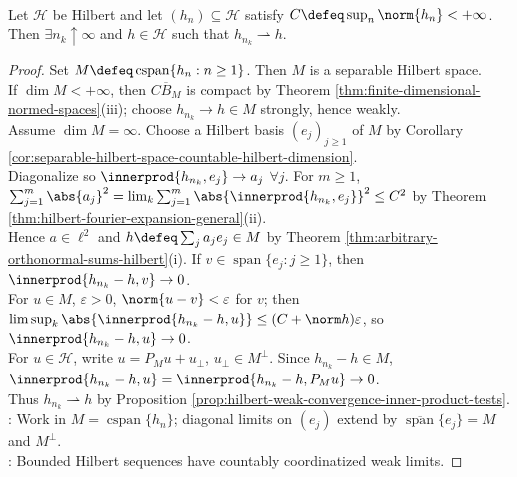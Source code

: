 \begin{theorem} \label{thm:hilbert-weak-subsequential-compactness} \\
Let $\mathcal{H}$ be Hilbert and let $(h_n)\subseteq\mathcal{H}$ satisfy $C\defeq\sup_n\norm{h_n}<+\infty$. Then $\exists n_k\uparrow\infty$ and $h\in\mathcal{H}$ such that $h_{n_k}\rightharpoonup h$.
\begin{proof} Set $M\defeq\operatorname{cspan}\{h_n:n\geq1\}$. Then $M$ is a separable Hilbert space.\\
If $\dim M<+\infty$, then $C\overline{B}_M$ is compact by Theorem \ref{thm:finite-dimensional-normed-spaces}(iii); choose $h_{n_k}\to h\in M$ strongly, hence weakly.\\
Assume $\dim M=\infty$. Choose a Hilbert basis $(e_j)_{j\geq1}$ of $M$ by Corollary \ref{cor:separable-hilbert-space-countable-hilbert-dimension}.\\
Diagonalize so $\innerprod{h_{n_k},e_j}\to a_j$ $\forall j$. For $m\geq1$, $\sum_{j=1}^m\abs{a_j}^2=\lim_k\sum_{j=1}^m\abs{\innerprod{h_{n_k},e_j}}^2\leq C^2$ by Theorem \ref{thm:hilbert-fourier-expansion-general}(ii).\\
Hence $a\in\ell^2$ and $h\defeq\sum_j a_je_j\in M$ by Theorem \ref{thm:arbitrary-orthonormal-sums-hilbert}(i). If $v\in\operatorname{span}\{e_j:j\geq1\}$, then $\innerprod{h_{n_k}-h,v}\to0$.\\
For $u\in M$, $\varepsilon>0$, $\norm{u-v}<\varepsilon$ for $v$; then $\limsup_k\abs{\innerprod{h_{n_k}-h,u}}\leq(C+\norm h)\varepsilon$, so $\innerprod{h_{n_k}-h,u}\to0$.\\
For $u\in\mathcal H$, write $u=P_Mu+u_\perp$, $u_\perp\in M^\perp$. Since $h_{n_k}-h\in M$, $\innerprod{h_{n_k}-h,u}=\innerprod{h_{n_k}-h,P_Mu}\to0$.\\
Thus $h_{n_k}\rightharpoonup h$ by Proposition \ref{prop:hilbert-weak-convergence-inner-product-tests}.\\
: Work in $M=\operatorname{cspan}\{h_n\}$; diagonal limits on $(e_j)$ extend by $\overline{\operatorname{span}}\{e_j\}=M$ and $M^\perp$.\\
: Bounded Hilbert sequences have countably coordinatized weak limits.
\end{proof}
\end{theorem}

